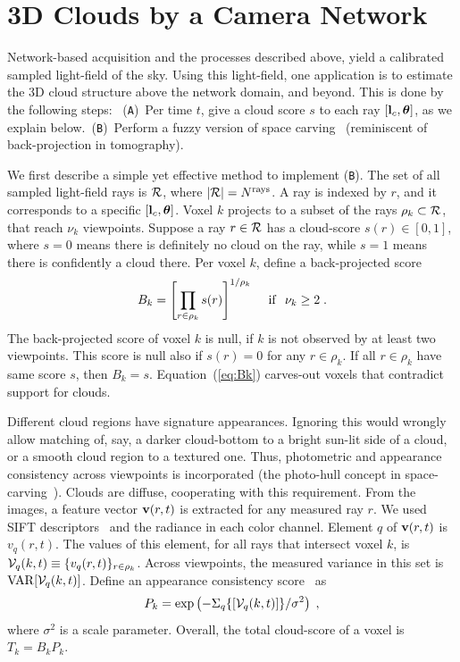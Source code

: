 \documentclass[runningheads]{llncs}
\begin{document}
\section{3D Clouds by a Camera Network}
\label{sec:3Dc}

Network-based acquisition and the processes described above, yield a calibrated sampled light-field of the sky. Using this light-field, one application is to estimate the 3D cloud structure above the network domain, and beyond. This is done by the following steps:~ %
({\tt A})~Per time $t$, give a {\rm cloud score} $s$  to each ray $[{\bf l}_c,{\bm \theta}]$, as we explain below.~({\tt B})~Perform a fuzzy version of space carving~\cite{Kutulakos2000,Ihrke2004} (reminiscent of back-projection in tomography).

We first describe a simple yet effective method to implement ({\tt B}).  The set of all sampled light-field rays is ${\cal R}$, where
\mbox{$|{\cal R}|=N^{\rm rays}$}. A ray is indexed by $r$, and it corresponds to a specific $[{\bf l}_c,{\bm \theta}]$. Voxel $k$ projects to a subset of the rays $\rho_k\subset{\cal R}$,
that reach $\nu_k$ viewpoints. Suppose a ray $r\in{\cal R}$ has a cloud-score $s(r)\in[0,1]$, where $s=0$ means there is definitely no cloud on the ray, while $s=1$ means there is confidently a cloud there. Per voxel $k$, define a back-projected score
\begin{equation}
 B_k= \left[ \prod_{r\in\rho_k} s(r)\right]^{1/\rho_k}
 \;\; ~~{\rm if}~~ \nu_k\geq 2
  \;.
 \label{eq:Bk}
\end{equation}
The back-projected score of voxel $k$ is null, if $k$ is not observed by at least two viewpoints. This score is null also if $s(r)=0$ for any $r\in\rho_k$. If all $r\in\rho_k$ have same score $s$, then $B_k=s$. Equation~(\ref{eq:Bk}) carves-out voxels that contradict support for clouds.

Different cloud regions have signature appearances. Ignoring this would wrongly allow matching of, say, a darker cloud-bottom to a bright sun-lit side of a cloud, or a smooth cloud region to a textured one. Thus, photometric and appearance consistency across viewpoints is incorporated (the photo-hull concept in space-carving~\cite{Kutulakos2000}). Clouds are diffuse, cooperating with this requirement.
From the images, a feature vector ${\bf v}(r,t)$ is extracted for any measured ray $r$.
We used SIFT descriptors~\cite{lowe2004distinctive} and the radiance in each color channel. Element $q$ of ${\bf v}(r,t)$ is $v_q(r,t)$. The values of this element, for all rays that intersect voxel $k$, is \mbox{${\cal V}_q(k,t)\equiv\{v_q(r,t)\}_{r\in\rho_k}$}.
Across viewpoints, the measured variance in this set is
${\rm VAR}[{\cal V}_q(k,t)]$. Define an appearance consistency score~\cite{Supp2014} as
\begin{equation}
 P_k= \exp\left(
         -\Sigma_q\{[{\cal V}_q(k,t)]\}/\sigma^2
         \right)
  \;,
 \label{eq:Dist}
\end{equation}
where $\sigma^2$ is a scale parameter. Overall, the total cloud-score of a voxel is $T_k=B_kP_k$.
\end{document}
